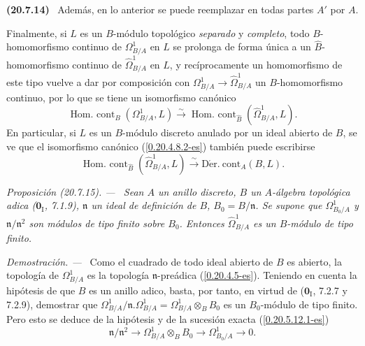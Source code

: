 \documentclass[10pt,oneside]{book}
\makeatletter
\newcommand{\sref}[1]{\textup{(\ref{#1})}}
\newcommand{\setmanualcurrentlabel}[1]{\def\@currentlabel{#1}}
\newcommand{\oldpage}[2][]{%
  \setcounter{footnote}{0}%
  \marginpar{\scriptsize\textbf{#1}~|~#2}\ignorespaces}
\newenvironment{env}[1][]{\setmanualcurrentlabel{#1}\par\medskip\noindent\textbf{(#1)}\ }{\par}
\newenvironment{proposition}[1][]{%
  \setmanualcurrentlabel{#1}\par\medskip\noindent\itshape Proposición (#1). ---\ }{\par}
\newenvironment{proof}{%
  \par\medskip\noindent\textit{Demostración. ---\ }}{\par}
\makeatother
\begin{document}
\begin{env}[20.7.14]
Además, en lo anterior se puede reemplazar en todas partes $A'$ por $A$.

Finalmente, si $L$ es un $B$-módulo topológico \emph{separado} y \emph{completo}, todo
$B$-homomorfismo continuo de $\Omega^1_{B/A}$ en $L$ se prolonga de forma
única a un $\widehat B$-homomorfismo continuo de
$\widehat{\Omega}^1_{B/A}$ en $L$, y recíprocamente un homomorfismo de este
tipo vuelve a dar por composición con $\Omega^1_{B/A}\to\widehat{\Omega}^1_{B/A}$
un $B$-homomorfismo continuo, por lo que se tiene un isomorfismo canónico
\[
  \operatorname{Hom.\ cont}_B(\Omega^1_{B/A},L)\xrightarrow{\sim}
  \operatorname{Hom.\ cont}_{\widehat B}(\widehat{\Omega}^1_{B/A},L).
\]
En particular, si $L$ es un $B$-módulo discreto anulado por un ideal
abierto de $B$, se ve que el isomorfismo canónico
\sref{0.20.4.8.2-es} también puede escribirse
\begin{equation}
\tag{20.7.14.4}
\label{0.20.7.14.4-es}
  \operatorname{Hom.\ cont}_{\widehat B}(\widehat{\Omega}^1_{B/A},L)
  \xrightarrow{\sim}\operatorname{D\acute{e}r.\ cont}_A(B,L).
\end{equation}
\end{env}

\begin{proposition}[20.7.15]
\label{0.20.7.15-es}
Sean $A$ un anillo discreto, $B$ un $A$-álgebra topológica adica
\textup{($\mathbf{0}_{\mathrm I}$, 7.1.9)}, $\mathfrak{n}$ un ideal de definición de
$B$, $B_0=B/\mathfrak{n}$. Se supone que $\Omega^1_{B_0/A}$ y
$\mathfrak{n}/\mathfrak{n}^2$ son módulos de tipo finito sobre $B_0$. Entonces
$\widehat{\Omega}^1_{B/A}$ es un $B$-módulo de tipo finito.
\end{proposition}

\begin{proof}
Como el cuadrado de todo ideal abierto de $B$ es abierto, la topología de
$\Omega^1_{B/A}$ es la topología $\mathfrak{n}$-preádica
\sref{0.20.4.5-es}. Teniendo en cuenta la hipótesis de que $B$ es un anillo adico,
basta, por tanto, en virtud de ($\mathbf{0}_{\mathrm I}$, 7.2.7 y 7.2.9), demostrar
\oldpage[0\textsubscript{IV-1}]{152}
que $\Omega^1_{B/A}/\mathfrak{n}.\Omega^1_{B/A}=
\Omega^1_{B/A}\otimes_B B_0$ es un $B_0$-módulo de tipo finito. Pero esto
se deduce de la hipótesis y de la sucesión exacta \sref{0.20.5.12.1-es}
\[
  \mathfrak{n}/\mathfrak{n}^2\to
  \Omega^1_{B/A}\otimes_B B_0\to\Omega^1_{B_0/A}\to0.
\]
\end{proof}
\end{document}
